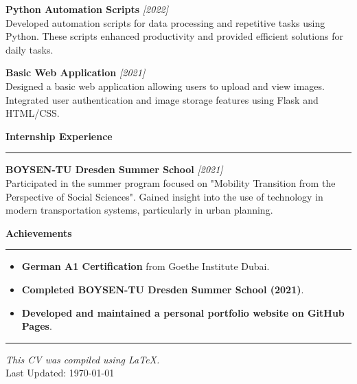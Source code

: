 \documentclass[a4paper,10pt]{article}
\newcommand{\CVSection}[1]{%
    \vspace{12pt}
    \textcolor{sectioncolor}{\Large\textbf{#1}} \\
    \rule{\textwidth}{0.5mm}
}
\begin{document}
\textbf{Python Automation Scripts} \hfill \textit{[2022]} \\
Developed automation scripts for data processing and repetitive tasks using Python. These scripts enhanced productivity and provided efficient solutions for daily tasks.

\textbf{Basic Web Application} \hfill \textit{[2021]} \\
Designed a basic web application allowing users to upload and view images. Integrated user authentication and image storage features using Flask and HTML/CSS.

\CVSection{Internship Experience}
\textbf{BOYSEN-TU Dresden Summer School} \hfill \textit{[2021]} \\
Participated in the summer program focused on "Mobility Transition from the Perspective of Social Sciences". Gained insight into the use of technology in modern transportation systems, particularly in urban planning.

\CVSection{Achievements}
\begin{itemize}[leftmargin=15pt]
    \item \textbf{German A1 Certification} from Goethe Institute Dubai.
    \item \textbf{Completed BOYSEN-TU Dresden Summer School (2021)}.
    \item \textbf{Developed and maintained a personal portfolio website on GitHub Pages}.
\end{itemize}

\vfill
\textcolor{headercolor}{\hrule}
\begin{center}
    \textit{This CV was compiled using \LaTeX.} \\
    Last Updated: \today
\end{center}
\end{document}
